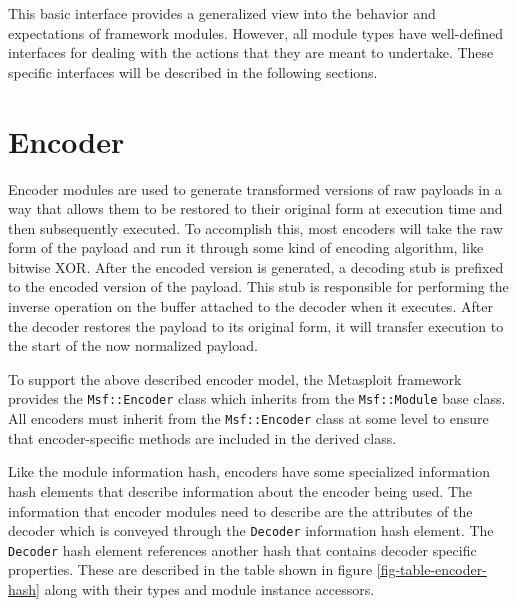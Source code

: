 \documentclass{report}
\begin{document}
\par
This basic interface provides a generalized view into the behavior
and expectations of framework modules.  However, all module types
have well-defined interfaces for dealing with the actions that they
are meant to undertake.  These specific interfaces will be described
in the following sections.

    \section{Encoder}

\par
Encoder modules are used to generate transformed versions of raw
payloads in a way that allows them to be restored to their original
form at execution time and then subsequently executed.  To
accomplish this, most encoders will take the raw form of the payload
and run it through some kind of encoding algorithm, like bitwise
XOR.  After the encoded version is generated, a decoding stub is
prefixed to the encoded version of the payload.  This stub is
responsible for performing the inverse operation on the buffer
attached to the decoder when it executes.  After the decoder
restores the payload to its original form, it will transfer
execution to the start of the now normalized payload.

\par
To support the above described encoder model, the Metasploit
framework provides the \texttt{Msf::Encoder} class which inherits
from the \texttt{Msf::Module} base class.  All encoders must inherit
from the \texttt{Msf::Encoder} class at some level to ensure that
encoder-specific methods are included in the derived class.

\par
Like the module information hash, encoders have some specialized
information hash elements that describe information about the
encoder being used.  The information that encoder modules need to
describe are the attributes of the decoder which is conveyed through
the \texttt{Decoder} information hash element.  The \texttt{Decoder}
hash element references another hash that contains decoder specific
properties.  These are described in the table shown in figure
\ref{fig-table-encoder-hash} along with their types and module
instance accessors.
\end{document}
